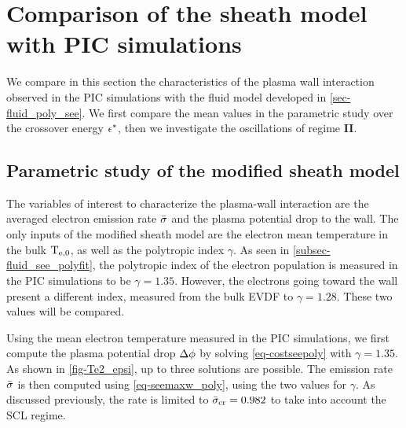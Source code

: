 

\section{Comparison of the sheath model with PIC simulations} \label{subsec-picandmodel}


  We compare in this section the characteristics of the plasma wall interaction observed in the \ac{PIC} simulations with the fluid model developed in \cref{sec-fluid_poly_see}.
  We first compare the mean values in the parametric study over the crossover energy $\epsilon^{*}$, then we investigate the oscillations of regime {\bf II}.

  \subsection{Parametric study of the modified sheath model} \label{subsec-param_sheath_see}

    The variables of interest to characterize the plasma-wall interaction are the averaged electron emission rate $ \bar{\sigma }$ and the plasma potential drop to the wall.
    The only inputs of the modified sheath model are the electron mean temperature in the bulk $\mathrm{T_{e, 0}}$, as well as the polytropic index $\gamma$.
    As seen in \cref{subsec-fluid_see_polyfit}, the polytropic index of the electron population is measured in the \ac{PIC} simulations to be $\gamma=1.35$.
    However, the electrons going toward the wall present a different index, measured from the bulk \ac{EVDF} to $\gamma=1.28$.
    These two values will be compared.

    Using the mean electron temperature measured in the \ac{PIC} simulations, we first compute the plasma potential drop $\Delta \phi$ by solving \cref{eq-costseepoly} with $\gamma=1.35$.
    As shown in \cref{fig-Te2_epsi}, up to three solutions are possible.
    The emission rate $ \bar{\sigma }$ is then computed using \cref{eq-seemaxw_poly}, using the two values for $\gamma$.
    As discussed previously, the rate is limited to $ \bar{\sigma }_{\rm cr}=0.982$ to take into account the \ac{SCL} regime.

